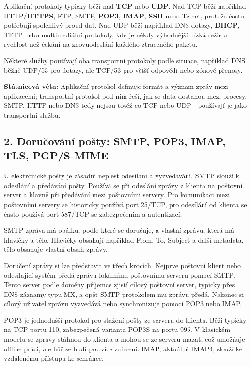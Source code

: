 \documentclass[11pt,a4paper]{article}
\newcommand{\itbox}[1]{\medskip\noindent\colorbox{black!6}{\parbox{\dimexpr\linewidth-2\fboxsep}{#1}}\medskip}
\begin{document}
Aplikační protokoly typicky běží nad \textbf{TCP} nebo \textbf{UDP}. Nad TCP běží například HTTP/\textbf{HTTPS}, FTP, SMTP, \textbf{POP3}, \textbf{IMAP}, \textbf{SSH} nebo Telnet, protože často potřebují spolehlivý proud dat. Nad UDP běží například DNS dotazy, \textbf{DHCP}, TFTP nebo multimediální protokoly, kde je někdy výhodnější nízká režie a rychlost než čekání na znovuodeslání každého ztraceného paketu.

Některé služby používají oba transportní protokoly podle situace, například DNS běžně UDP/53 pro dotazy, ale TCP/53 pro větší odpovědi nebo zónové přenosy.

\itbox{\textbf{Státnicová věta:} Aplikační protokol definuje formát a význam zpráv mezi aplikacemi; transportní protokol pod ním řeší, jak se data dostanou mezi procesy. SMTP, HTTP nebo DNS tedy nejsou totéž co TCP nebo UDP - používají je jako transportní službu.}

\subsection*{2. Doručování pošty: SMTP, POP3, IMAP, TLS, PGP/S-MIME}

U elektronické pošty je zásadní neplést odesílání a vyzvedávání. SMTP slouží k odesílání a předávání pošty. Používá se při odeslání zprávy z klienta na poštovní server a hlavně při předávání mezi poštovními servery. Pro komunikaci mezi poštovními servery se historicky používá port 25/TCP, pro odesílání od klienta se často používá port 587/TCP se zabezpečením a autentizací.

SMTP zpráva má obálku, podle které se doručuje, a vlastní zprávu, která má hlavičky a tělo. Hlavičky obsahují například From, To, Subject a další metadata, tělo obsahuje vlastní obsah zprávy.

Doručení zprávy si lze představit ve třech krocích. Nejprve poštovní klient nebo odesílající systém předá zprávu lokálnímu poštovnímu serveru pomocí SMTP. Tento server podle domény příjemce zjistí cílový poštovní server, typicky přes DNS záznamy typu MX, a opět SMTP protokolem mu zprávu předá. Nakonec si cílový uživatel zprávu vyzvedává nebo synchronizuje pomocí POP3 nebo IMAP.

POP3 je jednodušší protokol pro stažení pošty ze serveru do klienta. Běží typicky na TCP portu 110, zabezpečená varianta POP3S na portu 995. V klasickém modelu se zprávy stáhnou do klienta a mohou se ze serveru mazat, což umožňuje offline práci, ale hůř se hodí pro více zařízení. IMAP, aktuálně IMAP4, slouží ke vzdálenému přístupu ke schránce.
\end{document}
